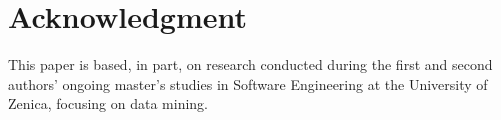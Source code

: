 \documentclass[10pt,conference,a4paper]{IEEEtran}
\begin{document}
\section*{Acknowledgment}
This paper is based, in part, on research conducted during the first and
second authors' ongoing master's studies in Software Engineering at the
University of Zenica, focusing on data mining.

\balance



\end{document}
